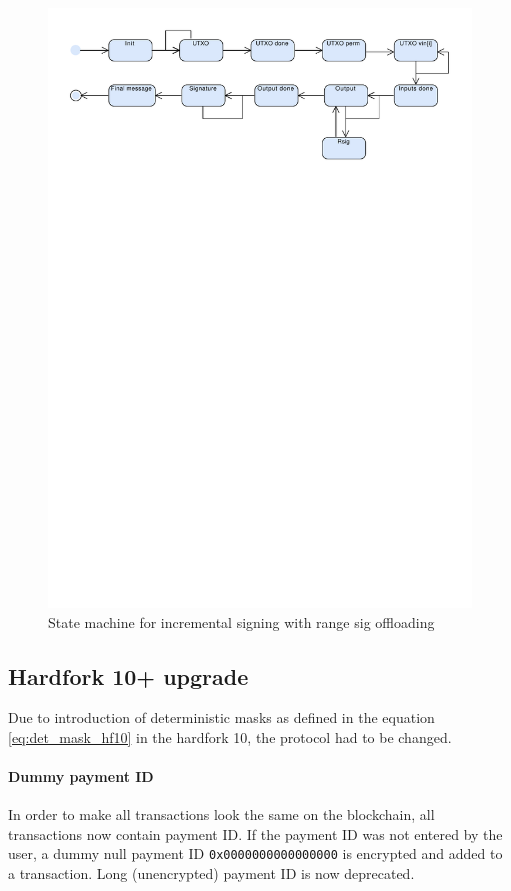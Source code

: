 \documentclass[]{article}
\begin{document}
\begin{figure}[H]
	\centering
	\includegraphics[width=1.\textwidth,trim={0 22cm 0 1cm},clip, angle=0]{img/tsx_state_detail_rsig.pdf}
	\caption{State machine for incremental signing with range sig offloading} \label{fig:detailed_state}
\end{figure}

\subsection{Hardfork 10+ upgrade}\label{sec:hf10}
Due to introduction of deterministic masks as defined in the equation \ref{eq:det_mask_hf10} in the hardfork 10, the protocol had to be changed.

\paragraph{Dummy payment ID}
In order to make all transactions look the same on the blockchain, all transactions now contain payment ID. If the payment ID was not entered by the user, a dummy null payment ID \verb|0x0000000000000000| is encrypted and added to a transaction.
Long (unencrypted) payment ID is now deprecated.
\end{document}
